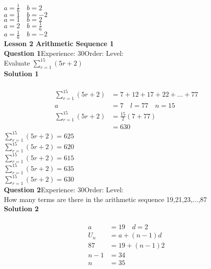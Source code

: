 \documentclass{article}
\begin{document}
$a=\displaystyle\frac{1}{6}\quad b=2$\\
$a=1 \quad b=-2$\\
$a=1 \quad b=2$\\
$a=2 \quad b=\displaystyle\frac{1}{6}$\\
$a=\displaystyle\frac{1}{6} \quad b=-2$\\
\noindent\large{\textbf{Lesson 2 Arithmetic Sequence 1}}\\[12pt]
\noindent\textbf{Question 1}\hspace{20pt}Experience: 30\hspace{20pt}Order: \hspace{20pt}Level: \\[2pt]
Evaluate $\displaystyle\sum_{r=1}^{15} (5r+2)$\\[4pt]
\noindent\textbf{Solution 1}\\[2pt]
\\[-10pt]\begin{align*}
\displaystyle\sum_{r=1}^{15} (5r+2)&=7+12+17+22+...+77\\[2pt]
a&=7\quad l=77 \quad n=15\\[2pt]
\displaystyle\sum_{r=1}^{15} (5r+2)&=\displaystyle\frac{15}{2}(7+77)\\[2pt]
&=630
\end{align*}
$\displaystyle\sum_{r=1}^{15} (5r+2)=625$\\
$\displaystyle\sum_{r=1}^{15} (5r+2)=620$\\
$\displaystyle\sum_{r=1}^{15} (5r+2)=615$\\
$\displaystyle\sum_{r=1}^{15} (5r+2)=635$\\
$\displaystyle\sum_{r=1}^{15} (5r+2)=630$\\
\noindent\textbf{Question 2}\hspace{20pt}Experience: 30\hspace{20pt}Order: \hspace{20pt}Level: \\[2pt]
How many terms are there in the arithmetic sequence 19,21,23,...,87\\[4pt]
\noindent\textbf{Solution 2}\\[2pt]
\\[-10pt]\begin{align*}
a&=19 \quad d=2\\[2pt]
U_n&=a+(n-1)d\\[2pt]
87&=19+(n-1)2\\[2pt]
n-1&=34\\[2pt]
n&=35
\end{align*}
\end{document}

